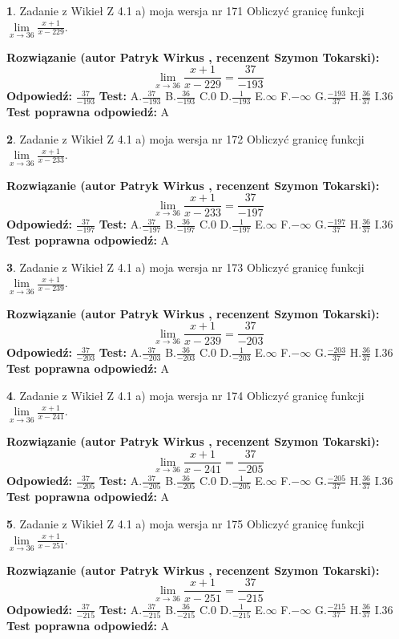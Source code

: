 \documentclass[12pt, a4paper]{article}
\theoremstyle{definition} %
\newtheorem{zad}{}
\newcommand{\zadStart}[1]{\begin{zad}#1\newline}
\newcommand{\zadStop}{\end{zad}}
\newcommand{\rozwStart}[2]{\noindent \textbf{Rozwiązanie (autor #1 , recenzent #2): }\newline}
\newcommand{\rozwStop}{\newline}
\newcommand{\odpStart}{\noindent \textbf{Odpowiedź:}\newline}
\newcommand{\odpStop}{\newline}
\newcommand{\testStart}{\noindent \textbf{Test:}\newline}
\newcommand{\testStop}{\newline}
\newcommand{\kluczStart}{\noindent \textbf{Test poprawna odpowiedź:}\newline}
\newcommand{\kluczStop}{\newline}
\begin{document}
\zadStart{Zadanie z Wikieł Z 4.1 a) moja wersja nr 171}
Obliczyć granicę funkcji $\lim\limits_{x\to36}\frac{x+1}{x-229}$.
\zadStop
\rozwStart{Patryk Wirkus}{Szymon Tokarski}
$$\lim\limits_{x\to36}\frac{x+1}{x-229} = \frac{37}{-193}$$
\rozwStop
\odpStart
$\frac{37}{-193}$
\odpStop
\testStart
A.$\frac{37}{-193}$
B.$\frac{36}{-193}$
C.$0$
D.$\frac{1}{-193}$
E.$\infty$
F.$-\infty$
G.$\frac{-193}{37}$
H.$\frac{36}{37}$
I.$36$
\testStop
\kluczStart
A
\kluczStop



\zadStart{Zadanie z Wikieł Z 4.1 a) moja wersja nr 172}
Obliczyć granicę funkcji $\lim\limits_{x\to36}\frac{x+1}{x-233}$.
\zadStop
\rozwStart{Patryk Wirkus}{Szymon Tokarski}
$$\lim\limits_{x\to36}\frac{x+1}{x-233} = \frac{37}{-197}$$
\rozwStop
\odpStart
$\frac{37}{-197}$
\odpStop
\testStart
A.$\frac{37}{-197}$
B.$\frac{36}{-197}$
C.$0$
D.$\frac{1}{-197}$
E.$\infty$
F.$-\infty$
G.$\frac{-197}{37}$
H.$\frac{36}{37}$
I.$36$
\testStop
\kluczStart
A
\kluczStop



\zadStart{Zadanie z Wikieł Z 4.1 a) moja wersja nr 173}
Obliczyć granicę funkcji $\lim\limits_{x\to36}\frac{x+1}{x-239}$.
\zadStop
\rozwStart{Patryk Wirkus}{Szymon Tokarski}
$$\lim\limits_{x\to36}\frac{x+1}{x-239} = \frac{37}{-203}$$
\rozwStop
\odpStart
$\frac{37}{-203}$
\odpStop
\testStart
A.$\frac{37}{-203}$
B.$\frac{36}{-203}$
C.$0$
D.$\frac{1}{-203}$
E.$\infty$
F.$-\infty$
G.$\frac{-203}{37}$
H.$\frac{36}{37}$
I.$36$
\testStop
\kluczStart
A
\kluczStop



\zadStart{Zadanie z Wikieł Z 4.1 a) moja wersja nr 174}
Obliczyć granicę funkcji $\lim\limits_{x\to36}\frac{x+1}{x-241}$.
\zadStop
\rozwStart{Patryk Wirkus}{Szymon Tokarski}
$$\lim\limits_{x\to36}\frac{x+1}{x-241} = \frac{37}{-205}$$
\rozwStop
\odpStart
$\frac{37}{-205}$
\odpStop
\testStart
A.$\frac{37}{-205}$
B.$\frac{36}{-205}$
C.$0$
D.$\frac{1}{-205}$
E.$\infty$
F.$-\infty$
G.$\frac{-205}{37}$
H.$\frac{36}{37}$
I.$36$
\testStop
\kluczStart
A
\kluczStop



\zadStart{Zadanie z Wikieł Z 4.1 a) moja wersja nr 175}
Obliczyć granicę funkcji $\lim\limits_{x\to36}\frac{x+1}{x-251}$.
\zadStop
\rozwStart{Patryk Wirkus}{Szymon Tokarski}
$$\lim\limits_{x\to36}\frac{x+1}{x-251} = \frac{37}{-215}$$
\rozwStop
\odpStart
$\frac{37}{-215}$
\odpStop
\testStart
A.$\frac{37}{-215}$
B.$\frac{36}{-215}$
C.$0$
D.$\frac{1}{-215}$
E.$\infty$
F.$-\infty$
G.$\frac{-215}{37}$
H.$\frac{36}{37}$
I.$36$
\testStop
\kluczStart
A
\kluczStop
\end{document}
